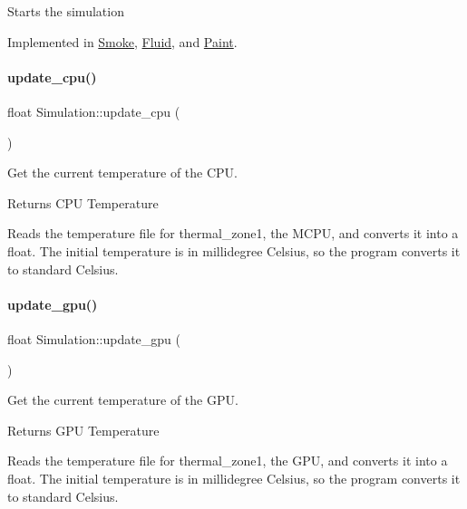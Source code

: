 Starts the simulation 

Implemented in \mbox{\hyperlink{classSmoke_aca6f4c3a6e62bf27920229c5b53ae561}{Smoke}}, \mbox{\hyperlink{classFluid_af249a75d7ef113842c226b8b939c8f90}{Fluid}}, and \mbox{\hyperlink{classPaint_a1f01fcd27e595cc9aacd1ef94e3e1454}{Paint}}.

\mbox{\label{classSimulation_a36aefdee44fabe9b8070363ca9eb80a7}} 
\paragraph{\texorpdfstring{update\_cpu()}{update\_cpu()}}
{\footnotesize\ttfamily float Simulation\+::update\+\_\+cpu (\begin{DoxyParamCaption}{ }\end{DoxyParamCaption})\hspace{0.3cm}{\ttfamily [inline]}}

Get the current temperature of the C\+PU. \begin{DoxyReturn}{Returns}
C\+PU Temperature
\end{DoxyReturn}
Reads the temperature file for thermal\+\_\+zone1, the M\+C\+PU, and converts it into a float. The initial temperature is in millidegree Celsius, so the program converts it to standard Celsius. \mbox{\label{classSimulation_a16ab6b7e3c5936bae78fc8c2daf658d2}} 
\paragraph{\texorpdfstring{update\_gpu()}{update\_gpu()}}
{\footnotesize\ttfamily float Simulation\+::update\+\_\+gpu (\begin{DoxyParamCaption}{ }\end{DoxyParamCaption})\hspace{0.3cm}{\ttfamily [inline]}}

Get the current temperature of the G\+PU. \begin{DoxyReturn}{Returns}
G\+PU Temperature
\end{DoxyReturn}
Reads the temperature file for thermal\+\_\+zone1, the G\+PU, and converts it into a float. The initial temperature is in millidegree Celsius, so the program converts it to standard Celsius. 

